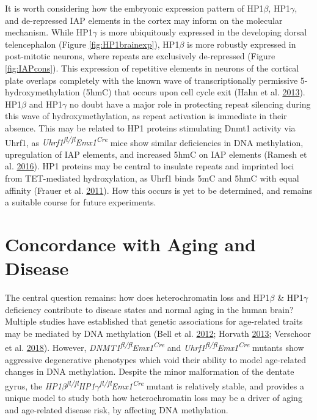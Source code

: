 \documentclass[onehalf,12pt]{beavtex}
\begin{document}
  It is worth considering how the embryonic expression pattern of
  HP1\(\beta\), HP1\(\gamma\), and de-repressed IAP elements in the cortex
  may inform on the molecular mechanism. While HP1\(\gamma\) is more
  ubiquitously expressed in the developing dorsal telencephalon (Figure
  \ref{fig:HP1brainexp}), HP1\(\beta\) is more robustly expressed in
  post-mitotic neurons, where repeats are exclusively de-repressed (Figure
  \ref{fig:IAPcons}). This expression of repetitive elements in neurons of
  the cortical plate overlaps completely with the known wave of
  transcriptionally permissive 5-hydroxymethylation (5hmC) that occurs
  upon cell cycle exit (Hahn et al.
  \protect\hyperlink{ref-HahnDynamics5HydroxymethylcytosineChromatin2013}{2013}).
  HP1\(\beta\) and HP1\(\gamma\) no doubt have a major role in protecting
  repeat silencing during this wave of hydroxymethylation, as repeat
  activation is immediate in their absence. This may be related to HP1
  proteins stimulating Dnmt1 activity via Uhrf1, as
  \emph{Uhrf1\textsuperscript{fl/fl}Emx1\textsuperscript{Cre}} mice show
  similar deficiencies in DNA methylation, upregulation of IAP elements,
  and increased 5hmC on IAP elements (Ramesh et al.
  \protect\hyperlink{ref-RameshLossUhrf1neural2016}{2016}). HP1 proteins
  may be central to insulate repeats and imprinted loci from TET-mediated
  hydroxylation, as Uhrf1 binds 5mC and 5hmC with equal affinity (Frauer
  et al.
  \protect\hyperlink{ref-FrauerRecognition5HydroxymethylcytosineUhrf12011}{2011}).
  How this occurs is yet to be determined, and remains a suitable course
  for future experiments.
  
  \section{Concordance with Aging and
  Disease}\label{concordance-with-aging-and-disease}
  
  The central question remains: how does heterochromatin loss and
  HP1\(\beta\) \& HP1\(\gamma\) deficiency contribute to disease states
  and normal aging in the human brain? Multiple studies have established
  that genetic associations for age-related traits may be mediated by DNA
  methylation (Bell et al.
  \protect\hyperlink{ref-BellEpigenomeWideScansIdentify2012a}{2012};
  Horvath \protect\hyperlink{ref-HorvathDNAmethylationage2013}{2013};
  Verschoor et al.
  \protect\hyperlink{ref-VerschoorDNAmethylationpatterns2018}{2018}).
  However, \emph{DNMT1\textsuperscript{fl/fl}Emx1\textsuperscript{Cre}}
  and \emph{Uhrf1\textsuperscript{fl/fl}Emx1\textsuperscript{Cre}} mutants
  show aggressive degenerative phenotypes which void their ability to
  model age-related changes in DNA methylation. Despite the minor
  malformation of the dentate gyrus, the
  \emph{HP1\(\beta\)\textsuperscript{fl/fl}HP1\(\gamma\)\textsuperscript{fl/fl}Emx1\textsuperscript{Cre}}
  mutant is relatively stable, and provides a unique model to study both
  how heterochromatin loss may be a driver of aging and age-related
  disease risk, by affecting DNA methylation.
  
\end{document}
